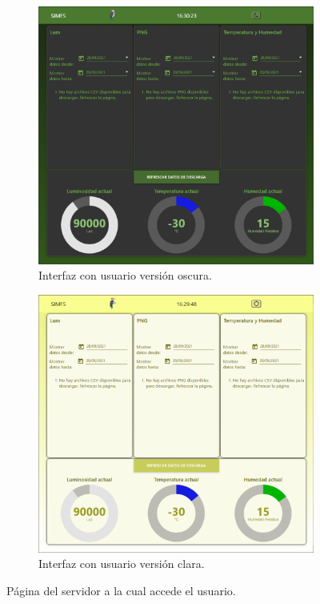 \begin{figure}[H]
\centering
	\begin{subfigure}[b]{0.49\textwidth}
		\centering
		\includegraphics[width=\linewidth]{ImagenesIngenieria de Detalle/Node-Red-Dark}		
		\caption{Interfaz con usuario versión oscura.}
		\label{fig:front_end_dark}
	\end{subfigure}
	\begin{subfigure}[b]{0.49\textwidth}
		\centering
		\includegraphics[width=\linewidth]{ImagenesIngenieria de Detalle/Node-Red-Light}		
		\caption{Interfaz con usuario versión clara.}
		\label{fig:front_end_light}
	\end{subfigure}	
	\caption{Página del servidor a la cual accede el usuario.}
	\label{fig:node_red}
\end{figure}

